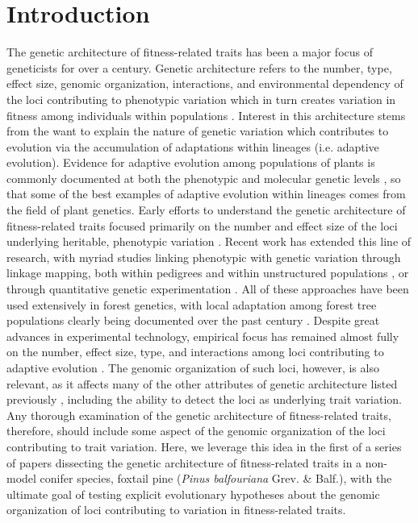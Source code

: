 \documentclass[11pt]{article}
\begin{document}
\section*{Introduction}
The genetic architecture of fitness-related traits has been a major focus of geneticists for 
over a century. Genetic architecture refers to the number, type, effect size, genomic organization, 
interactions, and environmental dependency of the loci contributing to phenotypic variation 
which in turn creates variation in fitness among individuals within populations \citep{Eckert:2012a}. 
Interest in this architecture stems from the want to explain the nature of genetic variation which 
contributes to evolution via the accumulation of adaptations within lineages (i.e. adaptive evolution).
Evidence for adaptive evolution among populations of plants is commonly documented at both the phenotypic 
and molecular genetic levels \citep{Kawecki:2004, Pannell:2013}, so that some of the best
examples of adaptive evolution within lineages comes from the field of plant genetics.
Early efforts to understand the genetic architecture of fitness-related traits
focused primarily on the number and effect size of the loci underlying heritable, phenotypic variation \citep{Fisher:1930}. 
Recent work has extended this line of research, with myriad studies linking phenotypic with genetic variation 
through linkage mapping, both within pedigrees \citep{Mauricio:2001, Neale:2011, Ritland:2011} and within 
unstructured populations \citep{Ingvarsson:2011, Eckert:2013a}, 
or through quantitative genetic experimentation \citep{Anderson:2013a, Anderson:2013b, Fournier-Level:2013}. All of these approaches 
have been used extensively in forest genetics, with local adaptation among forest tree populations clearly
being documented over the past century \citep{White:2007, Neale:2011}. Despite great advances in experimental technology, empirical 
focus has remained almost fully on the number, effect size, type, and interactions among loci contributing 
to adaptive evolution \citep{Neale:2011, Alberto:2013}. The genomic organization of such loci, however, 
is also relevant, as it affects many of the other attributes of genetic architecture listed previously 
\citep{Kirkpatrick:2006, Yeaman:2011, Yeaman:2013}, including the ability to detect the loci as underlying trait variation. 
Any thorough examination of the genetic architecture of fitness-related traits, therefore, should include 
some aspect of the genomic organization of the loci contributing to trait variation. Here, we leverage 
this idea in the first of a series of papers dissecting the genetic architecture of fitness-related 
traits in a non-model conifer species, foxtail pine (\textit{Pinus balfouriana} Grev. \& Balf.), with the 
ultimate goal of testing explicit evolutionary hypotheses about the genomic organization of loci 
contributing to variation in fitness-related traits.
\end{document}
